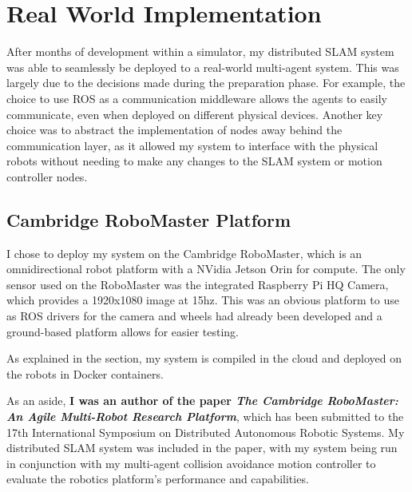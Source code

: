 \section{Real World Implementation}
\label{sec:real-world-implementation}
After months of development within a simulator, my distributed SLAM system was able to seamlessly be deployed to a real-world multi-agent system. This was largely due to the decisions made during the preparation phase. For example, the choice to use ROS as a communication middleware allows the agents to easily communicate, even when deployed on different physical devices. Another key choice was to abstract the implementation of nodes away behind the communication layer, as it allowed my system to interface with the physical robots without needing to make any changes to the SLAM system or motion controller nodes.

\subsection{Cambridge RoboMaster Platform}
\label{sec:cambridge-robomaster-platform}
I chose to deploy my system on the Cambridge RoboMaster, which is an omnidirectional robot platform with a NVidia Jetson Orin for compute. The only sensor used on the RoboMaster was the integrated Raspberry Pi HQ Camera, which provides a 1920x1080 image at 15hz. This was an obvious platform to use as ROS drivers for the camera and wheels had already been developed and a ground-based platform allows for easier testing.

As explained in the  section, my system is compiled in the cloud and deployed on the robots in Docker containers.

As an aside, \textbf{I was an author of the paper \textit{The Cambridge RoboMaster: An Agile Multi-Robot Research Platform}}, which has been submitted to the 17th International Symposium on Distributed Autonomous Robotic Systems. My distributed SLAM system was included in the paper, with my system being run in conjunction with my multi-agent collision avoidance motion controller to evaluate the robotics platform's performance and capabilities.


